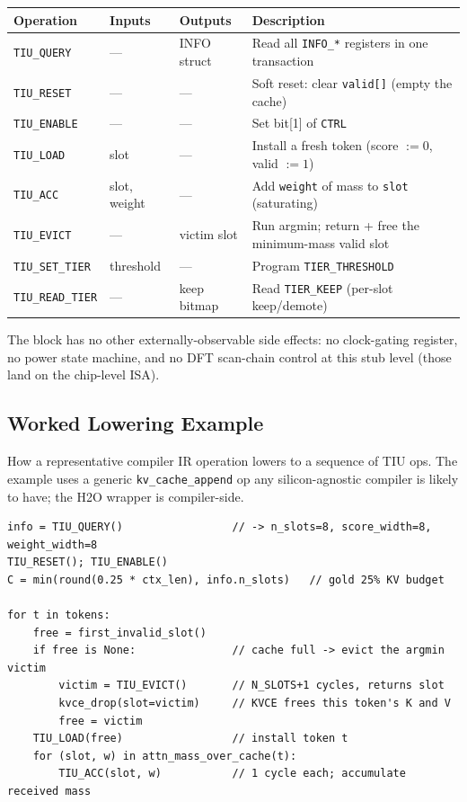 \documentclass[11pt]{article}
\begin{document}
\begin{table}[h]
\centering
\small
\begin{tabular}{@{}l l l p{5.6cm}@{}}
\toprule
Operation           & Inputs        & Outputs      & Description \\
\midrule
\texttt{TIU\_QUERY}     & ---           & INFO struct  & Read all \texttt{INFO\_*} registers in one transaction \\
\texttt{TIU\_RESET}     & ---           & ---          & Soft reset: clear \texttt{valid[]} (empty the cache) \\
\texttt{TIU\_ENABLE}    & ---           & ---          & Set bit[1] of \texttt{CTRL} \\
\texttt{TIU\_LOAD}      & slot          & ---          & Install a fresh token (score $:=0$, valid $:=1$) \\
\texttt{TIU\_ACC}       & slot, weight  & ---          & Add \texttt{weight} of mass to \texttt{slot} (saturating) \\
\texttt{TIU\_EVICT}     & ---           & victim slot  & Run argmin; return + free the minimum-mass valid slot \\
\texttt{TIU\_SET\_TIER} & threshold     & ---          & Program \texttt{TIER\_THRESHOLD} \\
\texttt{TIU\_READ\_TIER}& ---           & keep bitmap  & Read \texttt{TIER\_KEEP} (per-slot keep/demote) \\
\bottomrule
\end{tabular}
\end{table}

\noindent The block has no other externally-observable side effects: no
clock-gating register, no power state machine, and no DFT scan-chain control at
this stub level (those land on the chip-level ISA).

\subsection{Worked Lowering Example}
\label{sec:lowering}

How a representative compiler IR operation lowers to a sequence of TIU ops. The
example uses a generic \texttt{kv\_cache\_append} op any silicon-agnostic
compiler is likely to have; the H2O wrapper is compiler-side.

\begin{lstlisting}[basicstyle=\ttfamily\small]
info = TIU_QUERY()                 // -> n_slots=8, score_width=8, weight_width=8
TIU_RESET(); TIU_ENABLE()
C = min(round(0.25 * ctx_len), info.n_slots)   // gold 25% KV budget

for t in tokens:
    free = first_invalid_slot()
    if free is None:               // cache full -> evict the argmin victim
        victim = TIU_EVICT()       // N_SLOTS+1 cycles, returns slot
        kvce_drop(slot=victim)     // KVCE frees this token's K and V
        free = victim
    TIU_LOAD(free)                 // install token t
    for (slot, w) in attn_mass_over_cache(t):
        TIU_ACC(slot, w)           // 1 cycle each; accumulate received mass
\end{lstlisting}
\end{document}
